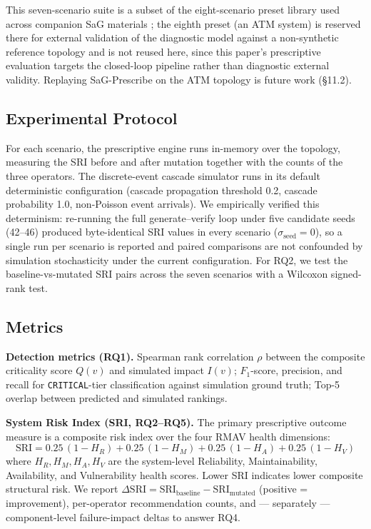 \documentclass[11pt]{article}
\begin{document}
This seven-scenario suite is a subset of the eight-scenario preset library used across companion SaG
materials \cite{SaG}; the eighth preset (an ATM system) is reserved there for external validation of
the diagnostic model against a non-synthetic reference topology and is not reused here, since this
paper's prescriptive evaluation targets the closed-loop pipeline rather than diagnostic external
validity. Replaying SaG-Prescribe on the ATM topology is future work (\S11.2).

\subsection{Experimental Protocol}

For each scenario, the prescriptive engine runs in-memory over the topology, measuring the SRI before
and after mutation together with the counts of the three operators. The discrete-event cascade
simulator runs in its default deterministic configuration (cascade propagation threshold 0.2, cascade
probability 1.0, non-Poisson event arrivals). We empirically verified this determinism: re-running the
full generate--verify loop under five candidate seeds (42--46) produced byte-identical SRI values in
every scenario ($\sigma_{\text{seed}} = 0$), so a single run per scenario is reported and paired
comparisons are not confounded by simulation stochasticity under the current configuration. For RQ2,
we test the baseline-vs-mutated SRI pairs across the seven scenarios with a Wilcoxon signed-rank test.

\subsection{Metrics}

\textbf{Detection metrics (RQ1).} Spearman rank correlation $\rho$ between the composite criticality
score $Q(v)$ and simulated impact $I(v)$; $F_1$-score, precision, and recall for \texttt{CRITICAL}-tier
classification against simulation ground truth; Top-5 overlap between predicted and simulated
rankings.

\textbf{System Risk Index (SRI, RQ2--RQ5).} The primary prescriptive outcome measure is a composite
risk index over the four RMAV health dimensions:
\begin{equation*}
\mathrm{SRI} = 0.25\,(1 - H_R) + 0.25\,(1 - H_M) + 0.25\,(1 - H_A) + 0.25\,(1 - H_V)
\end{equation*}
where $H_R, H_M, H_A, H_V$ are the system-level Reliability, Maintainability, Availability, and
Vulnerability health scores. Lower SRI indicates lower composite structural risk. We report
$\Delta\mathrm{SRI} = \mathrm{SRI}_{\text{baseline}} - \mathrm{SRI}_{\text{mutated}}$ (positive =
improvement), per-operator recommendation counts, and --- separately --- component-level
failure-impact deltas to answer RQ4.
\end{document}
